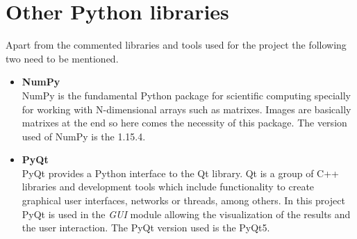 \section{Other Python libraries}
Apart from the commented libraries and tools used for the project the following two need to be mentioned.
\begin{itemize}
\item \textbf{NumPy}\\
NumPy is the fundamental Python package for scientific computing specially for working with N-dimensional arrays such as matrixes. Images are basically matrixes at the end so here comes the necessity of this package. The version used of NumPy is the 1.15.4.
\item \textbf{PyQt}\\
PyQt provides a Python interface to the Qt library. Qt is a group of C++ libraries and development tools which include functionality to create graphical user interfaces, networks or threads, among others. In this project PyQt is used in the \textit{GUI} module allowing the visualization of the results and the user interaction. The PyQt version used is the PyQt5.
\end{itemize}
